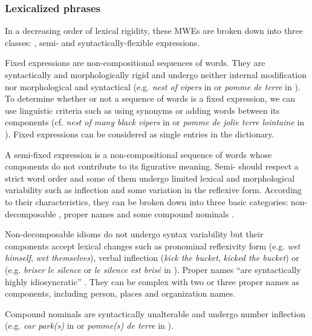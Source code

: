 \documentclass[output=paper,modfonts,nonflat]{langsci/langscibook}
\begin{document}
\subsubsection{Lexicalized phrases}\label{sec:semmar:3.2}
In a decreasing order of lexical rigidity, these MWEs are broken down into three classes: , semi- and syntactically-flexible expressions.

Fixed expressions are non-compositional sequences of words.
They are syntactically and morphologically rigid and undergo neither internal modification nor morphological and syntactical  (e.g. \textit{nest of vipers} in  or \textit{pom\-me de terre} in  ).
To determine whether or not a sequence of words is a fixed expression, we can use linguistic criteria such as using synonyms or adding words between its components (cf. \textit{nest of many black vipers} in  or \textit{pomme de jolie terre lointaine} in ).
Fixed expressions can be considered as single entries in the dictionary.

A semi-fixed expression is a non-compositional sequence of words whose components do not contribute to its figurative meaning.
Semi- should respect a strict word order and some of them undergo limited lexical and morphological variability such as inflection and some variation in the reflexive form.
According to their characteristics, they can be broken down into three basic categories: non-decomposable , proper names and some compound nominals \citep{sag02}.

Non-decomposable idioms do not undergo syntax variability but their components accept lexical changes such as pronominal reflexivity form (e.g. \textit{wet himself}, \textit{wet themselves}), verbal inflection (\textit{kick the bucket}, \textit{kicked the bucket}) or  (e.g. \textit{briser le silence} or  \textit{le silence est brisé} in ).
Proper names ``are syntactically highly idiosyncratic'' \citep{sag02}.
They can be complex with two or three proper names as components, including person, places and organization names.

Compound nominals are syntactically unalterable and undergo number inflection (e.g. \textit{car park(s)} in  or \textit{pomme(s) de terre} in ).

\end{document}
